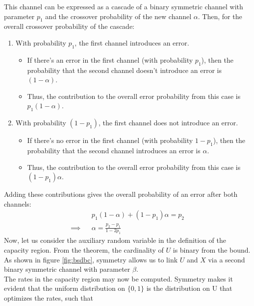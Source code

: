 %
This channel can be expressed as a cascade of a binary symmetric channel with parameter $p_1$ and the crossover probability of the new channel $\alpha$. Then, for the overall crossover probability of the cascade:
%
\begin{enumerate}
    \item With probability \( p_1 \), the first channel introduces an error.

    \begin{itemize}
        \item If there’s an error in the first channel (with probability \( p_1 \)), then the probability that the second channel doesn’t introduce an error is \( (1 - \alpha) \).

        \item Thus, the contribution to the overall error probability from this case is \( p_1 (1 - \alpha) \).
    \end{itemize}

    \item With probability \( (1 - p_1) \), the first channel does not introduce an error.

    \begin{itemize}
        \item If there’s no error in the first channel (with probability \( 1 - p_1 \)), then the probability that the second channel introduces an error is \( \alpha \).

        \item Thus, the contribution to the overall error probability from this case is \( (1 - p_1) \alpha \).
    \end{itemize}
\end{enumerate}
Adding these contributions gives the overall probability of an error after both channels:
%
\begin{eqnarray}
    && p_1 (1 - \alpha) + (1 - p_1) \alpha = p_2 \nonumber\\
    \implies && \alpha = \frac{p_2-p_1}{1-2p_1}
\end{eqnarray}
%
Now, let us consider the auxiliary random variable in the definition of the capacity region. From the theorem, the cardinality of $U$ is binary from the bound. As shown in figure \ref{fig:bsdbc}, symmetry allows us to link $U$ and $X$ via a second binary symmetric channel with parameter $\beta$. \\
The rates in the capacity region may now be computed. Symmetry makes it evident that the uniform distribution on $\{0, 1\}$ is the distribution on U that optimizes the rates, such that
